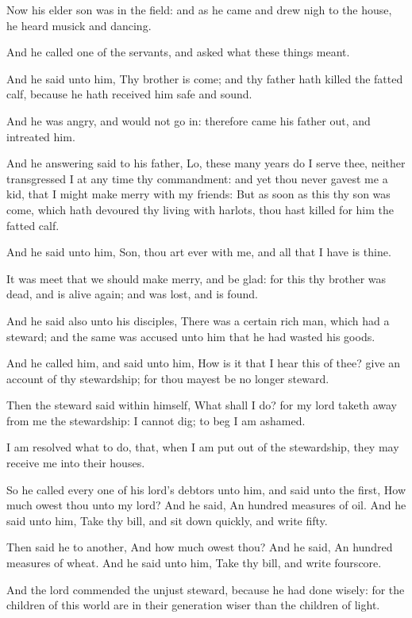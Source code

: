 \Verse Now his elder son was in the field: and as he came and drew nigh to the house, he heard musick and dancing.

\Verse And he called one of the servants, and asked what these things meant.

\Verse And he said unto him, Thy brother is come; and thy father hath killed the fatted calf, because he hath received him safe and sound.

\Verse And he was angry, and would not go in: therefore came his father out, and intreated him.

\Verse And he answering said to his father, Lo, these many years do I serve thee, neither transgressed I at any time thy commandment: and yet thou never gavest me a kid, that I might make merry with my friends: \Verse But as soon as this thy son was come, which hath devoured thy living with harlots, thou hast killed for him the fatted calf.

\Verse And he said unto him, Son, thou art ever with me, and all that I have is thine.

\Verse It was meet that we should make merry, and be glad: for this thy brother was dead, and is alive again; and was lost, and is found.


\Chapter
\Verse And he said also unto his disciples, There was a certain rich man, which had a steward; and the same was accused unto him that he had wasted his goods.

\Verse And he called him, and said unto him, How is it that I hear this of thee? give an account of thy stewardship; for thou mayest be no longer steward.

\Verse Then the steward said within himself, What shall I do? for my lord taketh away from me the stewardship: I cannot dig; to beg I am ashamed.

\Verse I am resolved what to do, that, when I am put out of the stewardship, they may receive me into their houses.

\Verse So he called every one of his lord's debtors unto him, and said unto the first, How much owest thou unto my lord?  \Verse And he said, An hundred measures of oil. And he said unto him, Take thy bill, and sit down quickly, and write fifty.

\Verse Then said he to another, And how much owest thou? And he said, An hundred measures of wheat. And he said unto him, Take thy bill, and write fourscore.

\Verse And the lord commended the unjust steward, because he had done wisely: for the children of this world are in their generation wiser than the children of light.

